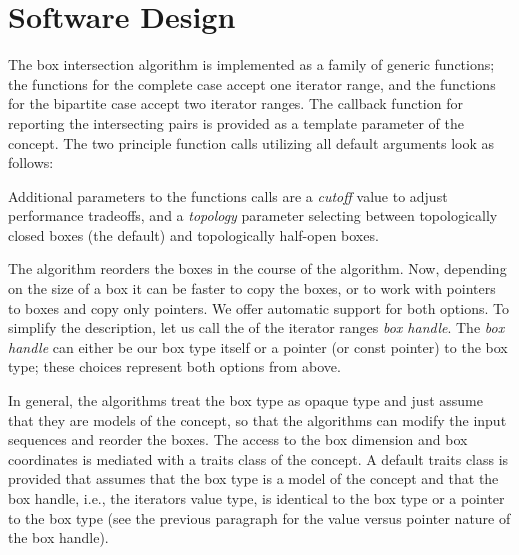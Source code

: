 \section{Software Design}

The box intersection algorithm is implemented as a family of generic
functions; the functions for the complete case accept one iterator
range, and the functions for the bipartite case accept two iterator
ranges. The callback function for reporting the intersecting pairs is
provided as a template parameter of the  concept.
The two principle function calls utilizing all default arguments look
as follows:





Additional parameters to the functions calls are a \emph{cutoff\/}
value to adjust performance tradeoffs, and a \emph{topology\/} parameter
selecting between topologically closed boxes (the default) and
topologically half-open boxes.

The algorithm reorders the boxes in the course of the algorithm. Now,
depending on the size of a box it can be faster to copy the boxes, or
to work with pointers to boxes and copy only pointers. We offer
automatic support for both options. To simplify the description, let us
call the  of the iterator ranges \emph{box handle}.
The \emph{box handle\/} can either be our box type itself or a
pointer (or const pointer) to the box type; these choices represent
both options from above.

In general, the algorithms treat the box type as opaque type and just
assume that they are models of the  concept, so that
the algorithms can modify the input sequences and reorder the boxes.
The access to the box dimension and box coordinates is mediated with a
traits class of the  concept. A default
traits class is provided that assumes that the box type is a model of
the  concept and that the box handle, i.e.,
the iterators value type, is identical to the box type or a pointer
to the box type (see the previous paragraph for the value versus
pointer nature of the box handle).

